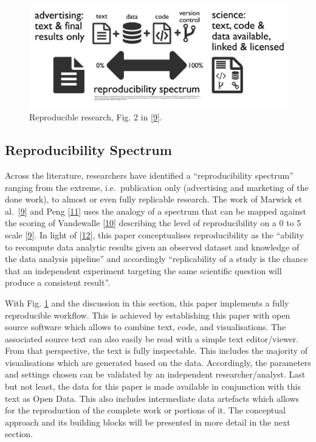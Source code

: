 \documentclass[conference,final,a4paper,]{IEEEtran}
\begin{document}
\begin{figure}[hbt]

{\centering \includegraphics[width=1\linewidth]{figures/reproducible-research-spectrum} 

}

\caption{Reproducible research, Fig. 2 in {[}\protect\hyperlink{ref-marwick_2017}{9}{]}.}\label{fig:reproducible-research}
\end{figure}

\hypertarget{reproducibility-spectrum}{%
\subsection{Reproducibility Spectrum}\label{reproducibility-spectrum}}

Across the literature, researchers have identified a ``reproducibility spectrum'' ranging from the extreme, i.e.~publication only (advertising and marketing of the done work), to almost or even fully replicable research.
The work of Marwick et al.~{[}\protect\hyperlink{ref-marwick_2017}{9}{]} and Peng {[}\protect\hyperlink{ref-Peng1226}{11}{]} uses the analogy of a spectrum that can be mapped against the scoring of Vandewalle {[}\protect\hyperlink{ref-vandewalle_2009}{10}{]} describing the level of reproducibility on a 0 to 5 scale {[}\protect\hyperlink{ref-marwick_2017}{9}{]}.
In light of {[}\protect\hyperlink{ref-leek_2015}{12}{]}, this paper conceptualises reproducibility as the ``ability to recompute data analytic results given an observed dataset and knowledge of the data analysis pipeline'' and accordingly ``replicability of a study is the chance that an independent experiment targeting the same scientific question will produce a consistent result''.

With Fig. \ref{fig:reproducible-research} and the discussion in this section, this paper implements a fully reproducible workflow.
This is achieved by establishing this paper with open source software which allows to combine text, code, and visualisations.
The associated source text can also easily be read with a simple text editor/viewer. From that perspective, the text is fully inspectable.
This includes the majority of visualisations which are generated based on the data. Accordingly, the parameters and settings chosen can be validated by an independent researcher/analyst. Last but not least, the data for this paper is made available in conjunction with this text as Open Data. This also includes intermediate data artefacts which allows for the reproduction of the complete work or portions of it.
The conceptual approach and its building blocks will be presented in more detail in the next section.
\end{document}

